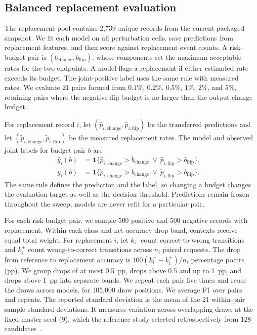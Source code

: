\documentclass{article}
\begin{document}
\subsection{Balanced replacement evaluation}

The replacement pool contains 2,739 unique records from the current packaged snapshot. We fit each model on all perturbation cells, save predictions from replacement features, and then score against replacement event counts. A risk-budget pair is $(b_{\mathrm{change}},b_{\mathrm{flip}})$, whose components set the maximum acceptable rates for the two endpoints. A model flags a replacement if either estimated rate exceeds its budget. The joint-positive label uses the same rule with measured rates. We evaluate 21 pairs formed from $0.1\%$, $0.2\%$, $0.5\%$, $1\%$, $2\%$, and $5\%$, retaining pairs where the negative-flip budget is no larger than the output-change budget.

For replacement record $i$, let $(\hat p_{i,\mathrm{change}},\hat p_{i,\mathrm{flip}})$ be the transferred predictions and let $(\tilde p_{i,\mathrm{change}},\tilde p_{i,\mathrm{flip}})$ be the measured replacement rates. The model and observed joint labels for budget pair $b$ are
\begin{equation}
\begin{aligned}
\hat y_i(b)&=\mathbf{1}\{\hat p_{i,\mathrm{change}}>b_{\mathrm{change}}\ \lor\ \hat p_{i,\mathrm{flip}}>b_{\mathrm{flip}}\},\\
y_i(b)&=\mathbf{1}\{\tilde p_{i,\mathrm{change}}>b_{\mathrm{change}}\ \lor\ \tilde p_{i,\mathrm{flip}}>b_{\mathrm{flip}}\}.
\end{aligned}
\label{eq:joint_rule}
\end{equation}
The same rule defines the prediction and the label, so changing a budget changes the evaluation target as well as the decision threshold. Predictions remain frozen throughout the sweep; models are never refit for a particular pair.

For each risk-budget pair, we sample 500 positive and 500 negative records with replacement. Within each class and net-accuracy-drop band, contexts receive equal total weight. For replacement $i$, let $k_i^-$ count correct-to-wrong transitions and $k_i^+$ count wrong-to-correct transitions across $n_i$ paired requests. The drop from reference to replacement accuracy is $100(k_i^- - k_i^+)/n_i$ percentage points (pp). We group drops of at most 0.5~pp, drops above 0.5 and up to 1~pp, and drops above 1~pp into separate bands. We repeat each pair five times and reuse the draws across models, for 105,000 draw positions. We average F1 over pairs and repeats. The reported standard deviation is the mean of the 21 within-pair sample standard deviations. It measures variation across overlapping draws at the fixed master seed (9), which the reference study selected retrospectively from 128 candidates~\citep{kernel_correctness_protocol}.
\end{document}
